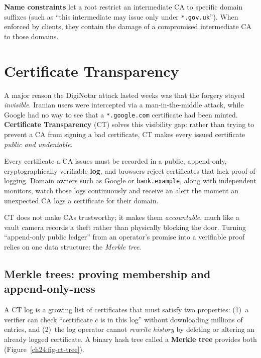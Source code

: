 \textbf{Name constraints} let a root restrict an intermediate CA to specific domain suffixes (such as ``this intermediate may issue only under \texttt{*.gov.uk}''). When enforced by clients, they contain the damage of a compromised intermediate CA to those domains.

\section{Certificate Transparency}
\label{ch24:ct}

A major reason the DigiNotar attack lasted weeks was that the forgery stayed \emph{invisible}. Iranian users were intercepted via a man-in-the-middle attack, while Google had no way to see that a \texttt{*.google.com} certificate had been minted. \textbf{Certificate Transparency} (CT) solves this visibility gap: rather than trying to prevent a CA from signing a bad certificate, CT makes every issued certificate \emph{public and undeniable}.

Every certificate a CA issues must be recorded in a public, append-only, cryptographically verifiable \textbf{log}, and browsers reject certificates that lack proof of logging. Domain owners such as Google or \texttt{bank.example}, along with independent monitors, watch those logs continuously and receive an alert the moment an unexpected CA logs a certificate for their domain.

\begin{intuitionbox}
CT does not make CAs trustworthy; it makes them \emph{accountable}, much like a vault camera records a theft rather than physically blocking the door. Turning ``append-only public ledger'' from an operator's promise into a verifiable proof relies on one data structure: the \emph{Merkle tree}.
\end{intuitionbox}

\subsection{Merkle trees: proving membership and append-only-ness}

A CT log is a growing list of certificates that must satisfy two properties: (1)~a verifier can check ``certificate $c$ is in this log'' without downloading millions of entries, and (2)~the log operator cannot \emph{rewrite history} by deleting or altering an already logged certificate. A binary hash tree called a \textbf{Merkle tree} provides both (Figure~\ref{ch24:fig-ct-tree}).

